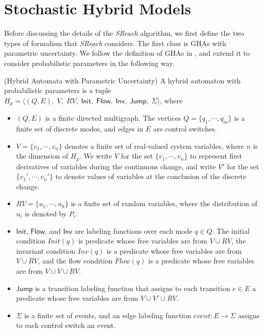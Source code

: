 \section{Stochastic Hybrid Models}
Before discussing the details of the {\it SReach} algorithm, we first define the two types of formalism that {\it SReach} considers. The first class is GHAs with parametric uncertainty. We follow the definition of GHAs in \cite{henzinger2000theory}, and extend it to consider probabilistic parameters in the following way.
\vspace{-.4cm}
\begin{definition}
\label{def:ha_para}
{\rm(Hybrid Automata with Parametric Uncertainty)} A hybrid automaton with probabilistic parameters is a tuple $H_p = \langle (Q, E), \;V, \;RV, \; \mathsf{Init},\; \mathsf{Flow}, \; \mathsf{Inv}, \; \mathsf{Jump}, \; \Sigma \rangle$, where
\vspace{-.4cm}
\begin{itemize}
\item $(Q, E)$ is a finite directed multigraph. The vertices $Q=\{q_1, \cdots,q_m\}$ is a finite set of discrete modes, and edges in $E$ are control switches.
\vspace{-.2cm}
\item $V = \{ v_1, \cdots, v_n \}$ denotes a finite set of real-valued system variables, where $n$ is the dimension of $H_p$. We write $\dot{V}$ for the set $\{\dot{v_1}, \cdots, \dot{v_n}\}$ to represent first derivatives of variables during the continuous change, and write $V'$ for the set $\{v_1', \cdots, v_n'\}$ to denote values of variables at the conclusion of the discrete change.
\vspace{-.2cm}
\item $RV = \{ u_1, \cdots, u_k \}$ is a finite set of random variables, where the distribution of $u_i$ is denoted by $P_i$.
\vspace{-.2cm}
\item $\mathsf{Init}$, $\mathsf{Flow}$, and $\mathsf{Inv}$ are labeling functions over each mode $q \in Q$. The initial condition $Init(q)$ is predicate whose free variables are from $V \cup RV$, the invariant condition $Inv(q)$ is a predicate whose free variables are from $V \cup RV$, and the flow condition $Flow(q)$ is a predicate whose free variables are from $V \cup \dot{V} \cup RV$.
\vspace{-.2cm}
\item $\mathsf{Jump}$ is a transition labeling function that assigns to each transition $e \in E$ a predicate whose free variables are from $V \cup V' \cup RV$.
\vspace{-.2cm}
\item $\Sigma$ is a finite set of events, and an edge labeling function $event: E \to \Sigma$ assigns to each control switch an event. 
\end{itemize}
\end{definition}
